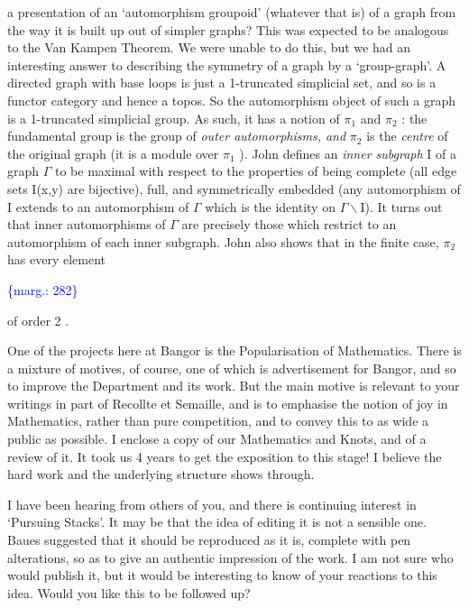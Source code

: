 \documentclass[11pt]{article}
\newcommand{\scanpage}[1]{\par\bigskip\noindent{\small\sffamily[scan #1]}\par}
\newcommand{\mspage}[1]{{\small\sffamily[p.\,#1]}}
\newcommand{\margin}[1]{\textcolor{blue}{\{\textsf{marg.:} #1\}}}
\begin{document}
a presentation of an `automorphism groupoid' (whatever that is) of a graph
from the way it is built up out of simpler graphs?  This was expected to be
analogous to the Van Kampen Theorem.
We were unable to do this, but we had an interesting answer to
describing the symmetry of a graph by a `group-graph'.  A directed graph
with base loops is just a 1-truncated simplicial set, and so is a functor
category and hence a topos.  So the automorphism object of such a graph is a
1-truncated simplicial group.  As such, it has a notion of $\pi_1$ and $\pi_2$ : the
fundamental group is the group of \textit{outer automorphisms, and} $\pi_2$ is the
\textit{centre} of the original graph (it is a module over $\pi_1$ ).  John defines an
\textit{inner subgraph} I of a graph $\Gamma$ to be maximal with respect to the properties
of being complete (all edge sets I(x,y) are bijective), full, and
symmetrically embedded (any automorphism of I extends to an automorphism of
$\Gamma$ which is the identity on $\Gamma\backslash$I).  It turns out that inner automorphisms of
$\Gamma$ are precisely those which restrict to an automorphism of each inner
subgraph.  John also shows that in the finite case, $\pi_2$ has every element

\mspage{1}

\margin{282}

\clearpage
\scanpage{119/283}
of order 2 .

One of the projects here at Bangor is the Popularisation of
Mathematics. There is a mixture of motives, of course, one of which is
advertisement for Bangor, and so to improve the Department and its work.
But the main motive is relevant to your writings in part of Recollte et
Semaille, and is to emphasise the notion of joy in Mathematics, rather than
pure competition, and to convey this to as wide a public as possible. I
enclose a copy of our Mathematics and Knots, and of a review of it. It took
us 4 years to get the exposition to this stage! I believe the hard work and
the underlying structure shows through.

I have been hearing from others of you, and there is continuing
interest in `Pursuing Stacks'. It may be that the idea of editing it is not
a sensible one. Baues suggested that it should be reproduced as it is,
complete with pen alterations, so as to give an authentic impression of the
work. I am not sure who would publish it, but it would be interesting to
know of your reactions to this idea. Would you like this to be
followed up?
\end{document}
